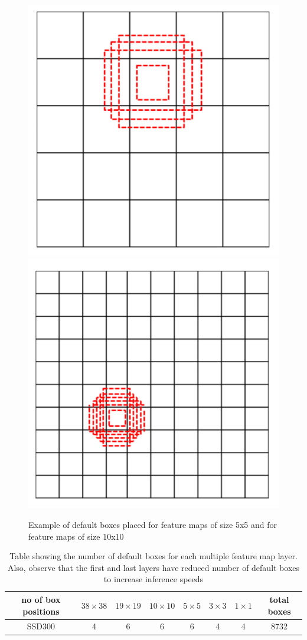      \begin{figure}
        \includegraphics[width=0.46\linewidth]{images/frameworks/feature_maps_5x5.png}\hfill
        \includegraphics[width=0.475\linewidth]{images/frameworks/feature_maps_10x10.png}
        \caption[Default box design]{Example of default boxes placed for feature maps of size 5x5 and for feature maps of size 10x10}
        \label{fig:bdd100k_samples}
    \end{figure}
     
     \begin{table}[H]
         \centering
         \caption{Table showing the number of default boxes for each multiple feature map layer. Also, observe that the first and last layers have reduced number of default boxes to increase inference speeds}
         \label{tab:priorbox_count}
         \begin{tabular}{|c|c|c|c|c|c|c|c|}
            \hline no of box positions & $38 \times 38$ & $19 \times 19$ & $10 \times 10$ & $5 \times 5$ & $3 \times 3$ & $1 \times 1$ & total boxes \\
            \hline SSD300 & 4 & 6 & 6 & 6 & 4 & 4 & 8732 \\
            \hline
        \end{tabular}
     \end{table}
     
